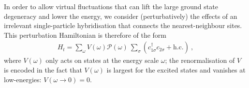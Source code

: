 \documentclass[reprint,hidelinks,onecolumn]{revtex4-2}
\begin{document}
In order to allow virtual fluctuations that can lift the large ground state degeneracy and lower the energy, we consider (perturbatively) the effects of an irrelevant single-particle hybridisation that connects the nearest-neighbour sites. This perturbation Hamiltonian is therefore of the form
\begin{equation}\begin{aligned}
	H_t = \sum_\omega V(\omega) \mathcal{P}(\omega)~\sum_\sigma\left(c^\dagger_{1\sigma}c_{2\sigma} + \text{h.c.}\right) ~,
\end{aligned}\end{equation}
where \(V(\omega)\) only acts on states at the energy scale \(\omega\); the renormalisation of \(V\) is encoded in the fact that \(V(\omega)\) is largest for the excited states and vanishes at low-energies: \(V(\omega \to 0) = 0\).
\end{document}

